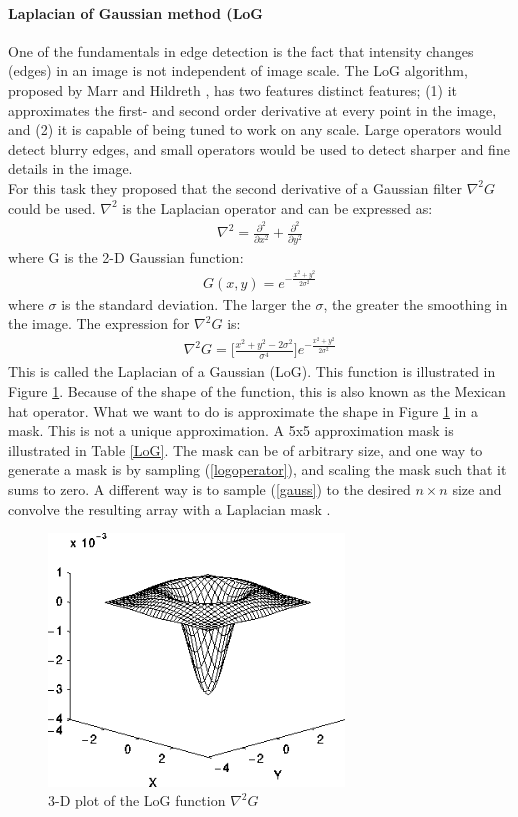 \paragraph{Laplacian of Gaussian method (LoG}
One of the fundamentals in edge detection is the fact that intensity changes (edges) in an image is not independent of image scale. The LoG algorithm, proposed by Marr and Hildreth \cite{mh}, has two features distinct features; (1) it approximates the first- and second order derivative at every point in the image, and (2) it is capable of being tuned to work on any scale. Large operators would detect blurry edges, and small operators would be used to detect sharper and fine details in the image. \\

For this task they proposed that the second derivative of a Gaussian filter $\nabla^2G$ could be used. $\nabla^2$ is the Laplacian operator and can be expressed as:
\begin{align}
\nabla^2 = \frac{\partial^2}{\partial x^2} + \frac{\partial^2}{\partial y^2}
\end{align}
where G is the 2-D Gaussian function:
\begin{align}
G(x,y) = e^{-\frac{x^2 +y^2}{2\sigma^2}}
\label{gauss}
\end{align}
where $\sigma$ is the standard deviation. The larger the $\sigma$, the greater the smoothing in the image. The expression for $\nabla^2G$ is:
\begin{align}
\nabla^2G = \Bigg[ \frac{x^2+y^2-2\sigma^2}{\sigma^4}\Bigg]e^{-\frac{x^2 +y^2}{2\sigma^2}}
\label{logoperator}
\end{align}
This is called the Laplacian of a Gaussian (LoG). This function is illustrated in Figure \ref{fig:log}. Because of the shape of the function, this is also known as the Mexican hat operator. What we want to do is approximate the shape in Figure \ref{fig:log} in a mask. This is not a unique approximation. A 5x5 approximation mask is illustrated in Table \ref{LoG}. The mask can be of arbitrary size, and one way to generate a mask is by sampling (\ref{logoperator}), and scaling the mask such that it sums to zero. A different way is to sample (\ref{gauss}) to the desired $n\times n$ size and convolve the resulting array with a Laplacian mask \cite{g}. 
\begin{figure}[h]
  \centering
  \includegraphics[width=0.7\textwidth]{fig/log}
  \caption{3-D plot of the LoG function $\nabla^2G$}
  \label{fig:log}
\end{figure}
